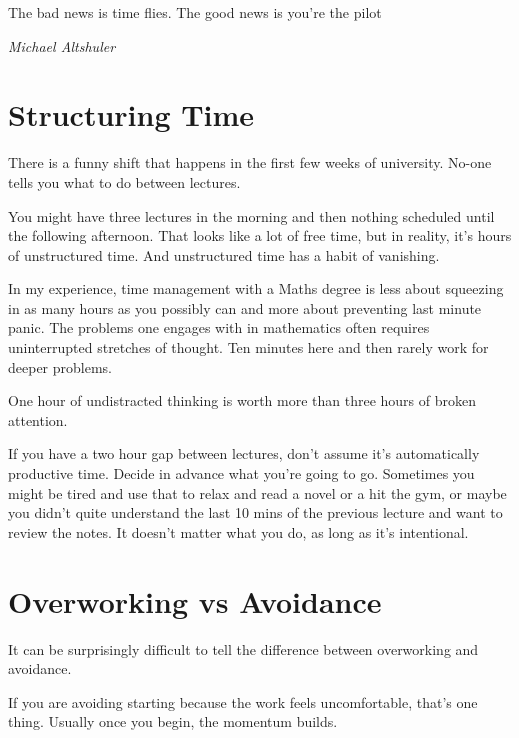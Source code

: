 \epigraph{The bad news is time flies. The good news is you're the pilot}
{\textit{Michael Altshuler}}






\section{Structuring Time}

There is a funny shift that happens in the first few weeks of university. No-one tells you what to do between lectures. 

You might have three lectures in the morning and then nothing scheduled until the following afternoon. That looks like a lot of free time, but in reality, it's hours of unstructured time. And unstructured time has a habit of vanishing. 

In my experience, time management with a Maths degree is less about squeezing in as many hours as you possibly can and more about preventing last minute panic. The problems one engages with in mathematics often requires uninterrupted stretches of thought. Ten minutes here and then rarely work for deeper problems.

One hour of undistracted thinking is worth more than three hours of broken attention. 

If you have a two hour gap between lectures, don't assume it's automatically productive time. Decide in advance what you're going to go. Sometimes you might be tired and use that to relax and read a novel or a hit the gym, or maybe you didn't quite understand the last 10 mins of the previous lecture and want to review the notes. It doesn't matter what you do, as long as it's intentional. 

\section{Overworking vs Avoidance}

It can be surprisingly difficult to tell the difference between overworking and avoidance.

If you are avoiding starting because the work feels uncomfortable, that’s one thing. Usually once you begin, the momentum builds.

